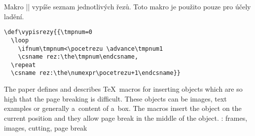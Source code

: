 \documentclass{csbulletin}
\def\JSvfil{\vfil}
\def\JSvss{\vskip0ptminus12pt}
\def\JSbreak{\break}
\begin{document}
Makro |\vypisrezy| vypíše seznam jednotlivých řezů. Toto makro je použito pouze pro účely ladění.
\begin{Verbatim}
\def\vypisrezy{{\tmpnum=0
  \loop
    \ifnum\tmpnum<\pocetrezu \advance\tmpnum1
    \csname rez:\the\tmpnum\endcsname,
  \repeat
  \csname rez:\the\numexpr\pocetrezu+1\endcsname}}
\end{Verbatim}








\iffalse
\def\refname{Seznam literatury}
\begin{thebibliography}{9}
\selectlanguage{english}
\raggedright

\bibitem{literate}
Jan Šustek. Generování dokumentovaného zdrojového souboru po blocích v~\TeX u. Zpravodaj Československého sdružení uživatelů \TeX u, 33(3--4):XX--YY, 2023.

\bibitem{rezaniweb}
Jan Šustek.
\url{https://github.com/jsustek/rezani/blob/main/rezani.tex}

\end{thebibliography}
\fi

\begingroup
\sloppy
\printbibliography
\endgroup


\begin{summary}
The paper defines and describes \TeX\ macros for inserting objects which are so high that the page breaking is difficult. These objects can be images, text examples or generally a~content of a~box. The macros insert the object on the current position and they allow page break in the middle of the object.
\keywords: frames, images, cutting, page break
\end{summary}
\end{document}
